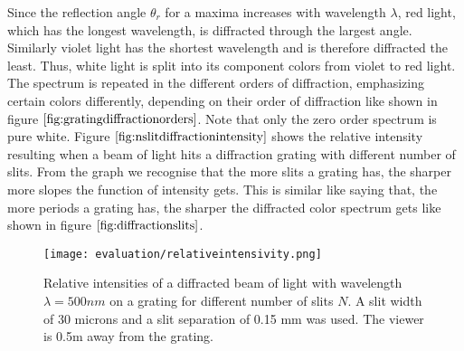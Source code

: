 Since the reflection angle $\theta_r$ for a maxima increases with wavelength $\lambda$, red light, which has the longest wavelength, is diffracted through the largest angle. Similarly violet light has the shortest wavelength and is therefore diffracted the least. Thus, white light is split into its component colors from violet to red light. The spectrum is repeated in the different orders of diffraction, emphasizing certain colors differently, depending on their order of diffraction like shown in figure $\ref{fig:gratingdiffractionorders}$. Note that only the zero order spectrum is pure white. Figure $\ref{fig:nslitdiffractionintensity}$ shows the relative intensity resulting when a beam of light hits a diffraction grating with different number of slits. From the graph we recognise that the more slits a grating has, the sharper more slopes the function of intensity gets. This is similar like saying that, the more periods a grating has, the sharper the diffracted color spectrum gets like shown in figure $\ref{fig:diffractionslits}$. 

\begin{figure}[H]
  \centering
  \texttt{[image: evaluation/relativeintensivity.png]}
  \caption[Intensity Plots for Different Number of Slits]{Relative intensities of a diffracted beam of light with wavelength $\lambda=500nm$ on a grating for different number of slits $N$. A slit width of 30 microns and a slit separation of 0.15 mm was used. The viewer is 0.5m away from the grating.}
  \label{fig:nslitdiffractionintensity}
\end{figure}

